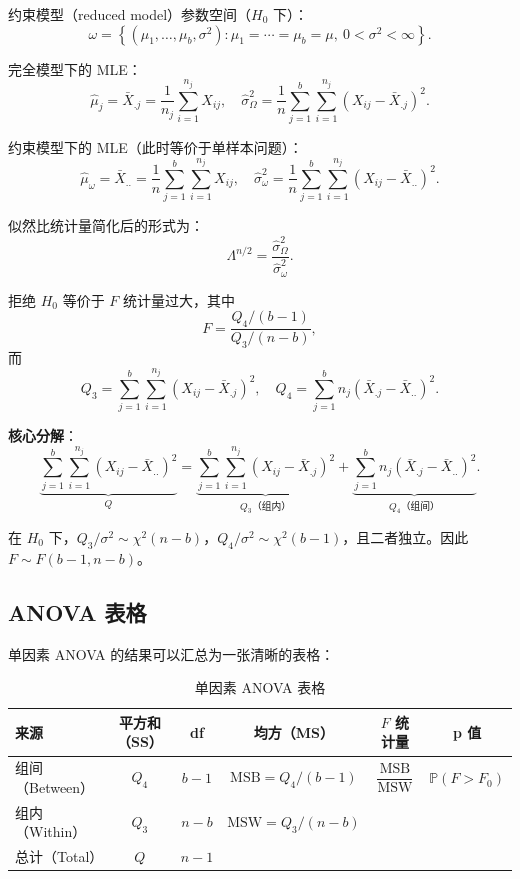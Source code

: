 约束模型（reduced model）参数空间（$H_0$ 下）：
\[
\omega = \left\{(\mu_1, \ldots, \mu_b, \sigma^2): \mu_1 = \cdots = \mu_b = \mu,\ 0 < \sigma^2 < \infty \right\}.
\]

完全模型下的 MLE：
\[
\hat{\mu}_j = \bar{X}_{.j} = \frac{1}{n_j}\sum_{i=1}^{n_j} X_{ij},\quad
\hat{\sigma}_\Omega^2 = \frac{1}{n}\sum_{j=1}^b \sum_{i=1}^{n_j} (X_{ij} - \bar{X}_{.j})^2.
\label{eq:one-way-mle-omega}
\]

约束模型下的 MLE（此时等价于单样本问题）：
\[
\hat{\mu}_\omega = \bar{X}_{..} = \frac{1}{n}\sum_{j=1}^b \sum_{i=1}^{n_j} X_{ij},\quad
\hat{\sigma}_\omega^2 = \frac{1}{n}\sum_{j=1}^b \sum_{i=1}^{n_j} (X_{ij} - \bar{X}_{..})^2.
\label{eq:one-way-mle-omega-constraint}
\]

似然比统计量简化后的形式为：
\[
\Lambda^{n/2} = \frac{\hat{\sigma}_\Omega^2}{\hat{\sigma}_\omega^2}.
\label{eq:one-way-lrt}
\]

拒绝 $H_0$ 等价于 $F$ 统计量过大，其中
\[
F = \frac{Q_4 / (b-1)}{Q_3 / (n-b)},
\label{eq:one-way-F}
\]
而
\[
Q_3 = \sum_{j=1}^b \sum_{i=1}^{n_j} (X_{ij} - \bar{X}_{.j})^2,\quad
Q_4 = \sum_{j=1}^b n_j (\bar{X}_{.j} - \bar{X}_{..})^2.
\label{eq:one-way-sum-squares}
\]

\textbf{核心分解}：
\[
\underbrace{\sum_{j=1}^b \sum_{i=1}^{n_j} (X_{ij} - \bar{X}_{..})^2}_{Q} =
\underbrace{\sum_{j=1}^b \sum_{i=1}^{n_j} (X_{ij} - \bar{X}_{.j})^2}_{Q_3\text{（组内）}} +
\underbrace{\sum_{j=1}^b n_j (\bar{X}_{.j} - \bar{X}_{..})^2}_{Q_4\text{（组间）}}.
\label{eq:one-way-ss-decomposition}
\]

在 $H_0$ 下，$Q_3/\sigma^2 \sim \chi^2(n-b)$，$Q_4/\sigma^2 \sim \chi^2(b-1)$，且二者独立。因此 $F \sim F(b-1, n-b)$。

\subsection{ANOVA 表格}

单因素 ANOVA 的结果可以汇总为一张清晰的表格：

\begin{table}[H]
\centering
\caption{单因素 ANOVA 表格}\label{tab:one-way-anova}
\begin{tabular}{lccccc}
\hline
\textbf{来源} & \textbf{平方和（SS）} & \textbf{df} & \textbf{均方（MS）} & $F$ 统计量 & \textbf{p 值} \\
\hline
组间（Between） & $Q_4$ & $b-1$ & $\mathrm{MSB} = Q_4/(b-1)$ & $\dfrac{\mathrm{MSB}}{\mathrm{MSW}}$ & $\mathbb{P}(F > F_0)$ \\[6pt]
组内（Within） & $Q_3$ & $n-b$ & $\mathrm{MSW} = Q_3/(n-b)$ & & \\[6pt]
\hline
总计（Total） & $Q$ & $n-1$ & & & \\
\hline
\end{tabular}
\end{table}

